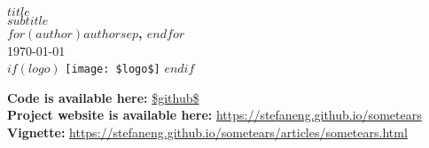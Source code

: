 \vspace{6em}
\begin{center}
    {\Large \textbf{$title$}} \\[1em]
    {\large \textit{$subtitle$}} \\[1em]
    \textbf{$for(author)$$author$$sep$, $endfor$} \\[1em]
    \today \\[1em]
    $if(logo)$
    \texttt{[image: \$logo\$]}
    $endif$
\end{center}
\textbf{Code is available here: } \url{$github$} \\[1em]
\textbf{Project website is available here: } \url{https://stefaneng.github.io/sometears} \\[1em]
\textbf{Vignette: } \url{https://stefaneng.github.io/sometears/articles/sometears.html} \\[1em]

\newpage
